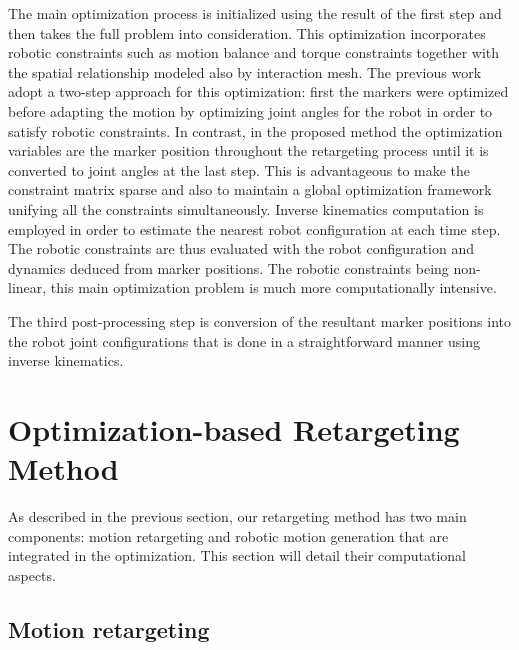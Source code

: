 \documentclass[letterpaper, 10 pt, conference]{ieeeconf}  %
\begin{document}
The main optimization process is initialized using the result of the 
first step and then takes the full problem into consideration. 
This optimization incorporates robotic constraints such as
motion balance and torque constraints together with the spatial
relationship modeled also by interaction mesh.
The previous work \cite{Nakaoka12Humanoids} adopt a two-step approach
for this optimization:
first the markers were optimized before adapting the motion by
optimizing joint angles for the robot in order to satisfy robotic
constraints.  
In contrast, in the proposed method the
optimization variables are the marker position throughout the
retargeting process until it is converted to joint angles at the last
step.
This is advantageous to make the constraint matrix sparse \cite{Komura10}
and also to maintain a global optimization framework
unifying all the constraints simultaneously. 
Inverse  kinematics computation is employed in order to estimate the
nearest robot configuration at each time step. The robotic
constraints are thus evaluated with the robot configuration and
dynamics deduced from marker positions. 
The robotic constraints being non-linear, this main
optimization problem is much more computationally intensive.

The third post-processing step is conversion of the resultant marker
positions into the robot joint configurations that is done in a
straightforward manner using inverse kinematics.  


\section{Optimization-based Retargeting Method}
\label{sec:retargeting}

As described in the previous section, our retargeting method has two
main components: motion retargeting and robotic motion generation that
are integrated in the optimization. This section will detail
their computational aspects.

\subsection{Motion retargeting}
\end{document}
